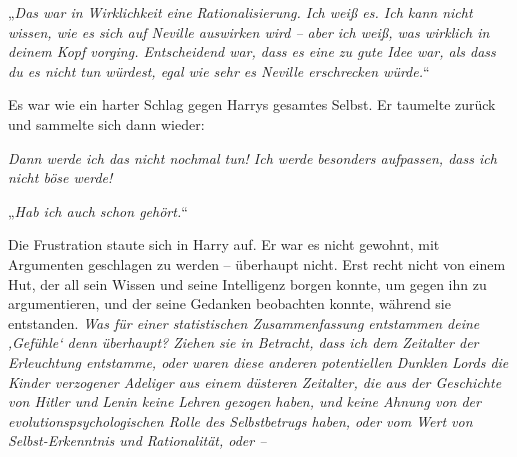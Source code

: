 „\emph{Das war in Wirklichkeit eine Rationalisierung. Ich weiß es. Ich kann nicht wissen, wie es sich auf Neville auswirken wird – aber ich weiß, was wirklich in deinem Kopf vorging. Entscheidend war, dass es eine zu gute Idee war, als dass du es \emph{nicht} tun würdest, egal wie sehr es Neville erschrecken würde.}“

Es war wie ein harter Schlag gegen Harrys gesamtes Selbst. Er taumelte zurück und sammelte sich dann wieder:

\emph{Dann werde ich das nicht nochmal tun! Ich werde besonders aufpassen, dass ich nicht böse werde! }

„\emph{Hab ich auch schon gehört.}“

Die Frustration staute sich in Harry auf. Er war es nicht gewohnt, mit Argumenten geschlagen zu werden – überhaupt nicht. Erst recht nicht von einem Hut, der all sein Wissen und seine Intelligenz borgen konnte, um gegen ihn zu argumentieren, und der seine Gedanken beobachten konnte, während sie entstanden. \emph{Was für einer statistischen Zusammenfassung entstammen deine ‚Gefühle‘ denn überhaupt? Ziehen sie in Betracht, dass ich dem Zeitalter der Erleuchtung entstamme, oder waren diese anderen potentiellen Dunklen Lords die Kinder verzogener Adeliger aus einem düsteren Zeitalter, die aus der Geschichte von Hitler und Lenin keine Lehren gezogen haben, und keine Ahnung von der evolutionspsychologischen Rolle des Selbstbetrugs haben, oder vom Wert von Selbst-Erkenntnis und Rationalität, oder – }

